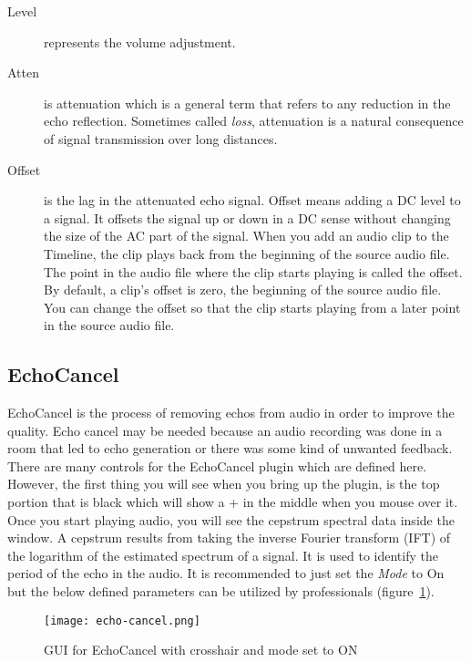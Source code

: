 \begin{description}
    \item[Level] represents the volume adjustment.
    \item[Atten] is attenuation which is a general term that refers to any reduction in the echo reflection. Sometimes called \textit{loss}, attenuation is a natural consequence of signal transmission over long distances.
    \item[Offset] is the lag in the attenuated echo signal. Offset means adding a DC level to a signal. It offsets the signal up or down in a DC sense without changing the size of the AC part of the signal. When you add an audio clip to the Timeline, the clip plays back from the beginning of the source audio file. The point in the audio file where the clip starts playing is called the offset. By default, a clip’s offset is zero, the beginning of the source audio file. You can change the offset so that the clip starts playing from a later point in the source audio file.
\end{description}

\subsection{EchoCancel}%
\label{sub:echocancel}

EchoCancel is the process of removing echos from audio in order to improve the quality. Echo cancel may be needed because an audio recording was done in a room that led to echo generation or there was some kind of unwanted feedback. There are many controls for the EchoCancel plugin which are defined here. However, the first thing you will see when you bring up the plugin, is the top portion that is black which will show a + in the middle when you mouse over it. Once you start playing audio, you will see the cepstrum spectral data inside the window. A cepstrum results from taking the inverse Fourier transform (IFT) of the logarithm of the estimated spectrum of a signal. It is used to identify the period of the echo in the audio. It is recommended to just set the \textit{Mode} to On but the below defined parameters can be utilized by professionals (figure~\ref{fig:echo-cancel}).

\begin{figure}[htpb]
    \centering
    \texttt{[image: echo-cancel.png]}
    \caption{GUI for EchoCancel with crosshair and mode set to ON}
    \label{fig:echo-cancel}
\end{figure}

